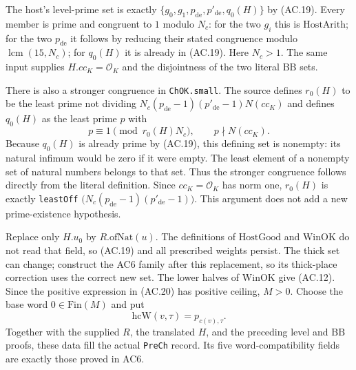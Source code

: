 The host's level-prime set is exactly
$\{g_0,g_1,p_{\mathrm{de}},p'_{\mathrm{de}},q_0(H)\}$ by
(AC.19). Every member is prime and congruent to $1$ modulo $N_c$:
for the two $g_i$ this is $\mathrm{HostArith}$; for the two
$p_{\mathrm{de}}$ it follows by reducing their stated congruence
modulo $\operatorname{lcm}(15,N_c)$; for $q_0(H)$ it is already
in (AC.19). Here $N_c>1$.
The same input supplies $H.cc_K=\mathcal O_K$ and the disjointness
of the two literal $\mathrm{BB}$ sets.

There is also a stronger congruence in \texttt{ChOK.small}.
The source defines $r_0(H)$ to be the least prime not dividing
$N_c(p_{\mathrm{de}}-1)(p'_{\mathrm{de}}-1)N(cc_K)$ and defines
$q_0(H)$ as the least prime $p$ with
\[
              p\equiv1\pmod {r_0(H)N_c},
                           \qquad p\nmid N(cc_K).
\]
Because $q_0(H)$ is already prime by (AC.19), this defining set is
nonempty: its natural infimum would be zero if it were empty.
The least element of a nonempty set of natural numbers belongs to
that set. Thus the stronger congruence follows directly from the
literal definition. Since $cc_K=\mathcal O_K$ has norm one,
$r_0(H)$ is exactly \texttt{leastOff}
$\bigl(N_c(p_{\mathrm{de}}-1)(p'_{\mathrm{de}}-1)\bigr)$.
This argument does not add a new prime-existence hypothesis.

Replace only $H.u_0$ by $R.\mathrm{ofNat}(u)$.
The definitions of $\mathrm{HostGood}$ and $\mathrm{WinOK}$ do not
read that field, so (AC.19) and all prescribed weights persist.
The thick set can change; construct the AC6 family after this
replacement, so its thick-place correction uses the correct new set.
The lower halves of $\mathrm{WinOK}$ give (AC.12).
Since the positive expression in (AC.20) has positive ceiling,
$M>0$. Choose the base word $0\in\mathrm{Fin}(M)$ and put
\[
                         \mathrm{hcW}(v,\tau)=p_{c(v),\tau}.
\]
Together with the supplied $R$, the translated $H$, and the preceding
level and $\mathrm{BB}$ proofs, these data fill the actual
\texttt{PreCh} record. Its five word-compatibility fields are exactly
those proved in AC6.


